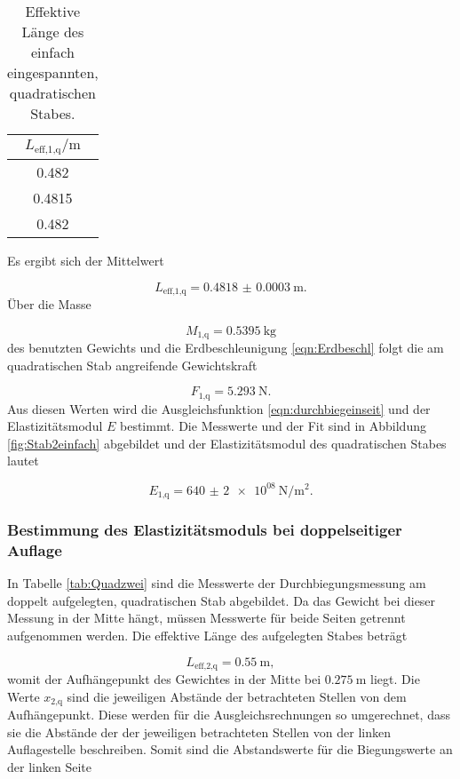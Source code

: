 \begin{table}[H]
  \centering
  \caption{Effektive Länge des einfach eingespannten, quadratischen Stabes.}
  \label{tab:Quadeinleff}
  \begin{tabular}{c}
    \toprule
    $L_\text{eff,1,q}/\si{\meter}$ \\
    \midrule
    0.482 \\
    0.4815 \\
    0.482 \\
    \bottomrule
  \end{tabular}
\end{table}

Es ergibt sich der Mittelwert

\begin{equation}
  L_\text{eff,1,q} = \SI{0.4818(3)}{\meter}.
\end{equation}
Über die Masse

\begin{equation}
  M_\text{1,q} =  \SI{0.5395}{\kilo\gram}
\end{equation}
des benutzten Gewichts
und die Erdbeschleunigung \eqref{eqn:Erdbeschl}
folgt die am quadratischen Stab angreifende Gewichtskraft

\begin{equation}
  F_\text{1,q} = \SI{5.293}{\newton}.
\end{equation}
Aus diesen Werten wird die Ausgleichsfunktion \eqref{eqn:durchbiegeinseit} und der
Elastizitätsmodul $E$ bestimmt. Die Messwerte und der Fit sind in Abbildung
\ref{fig:Stab2einfach} abgebildet und der Elastizitätsmodul des quadratischen
Stabes lautet

\begin{equation}
  E_\text{1,q} = \SI{640(2)e08}{\newton\per\meter\squared}.
\end{equation}

\subsubsection{Bestimmung des Elastizitätsmoduls bei doppelseitiger Auflage}

In Tabelle \ref{tab:Quadzwei} sind die Messwerte der Durchbiegungsmessung am
doppelt aufgelegten, quadratischen Stab abgebildet. Da das Gewicht bei dieser
Messung in der Mitte hängt, müssen Messwerte für beide Seiten getrennt
aufgenommen werden. Die effektive Länge des aufgelegten Stabes beträgt

\begin{equation}
  L_\text{eff,2,q} = \SI{0.55}{\meter},
\end{equation}
womit der Aufhängepunkt des Gewichtes in der Mitte bei $\SI{0.275}{\meter}$
liegt. Die Werte $x_\text{2,q}$ sind die jeweiligen Abstände der
betrachteten Stellen von dem Aufhängepunkt. Diese werden
für die Ausgleichsrechnungen so umgerechnet, dass sie die Abstände der
der jeweiligen betrachteten Stellen von der linken Auflagestelle beschreiben.
Somit sind die Abstandswerte für die Biegungswerte an der linken Seite

